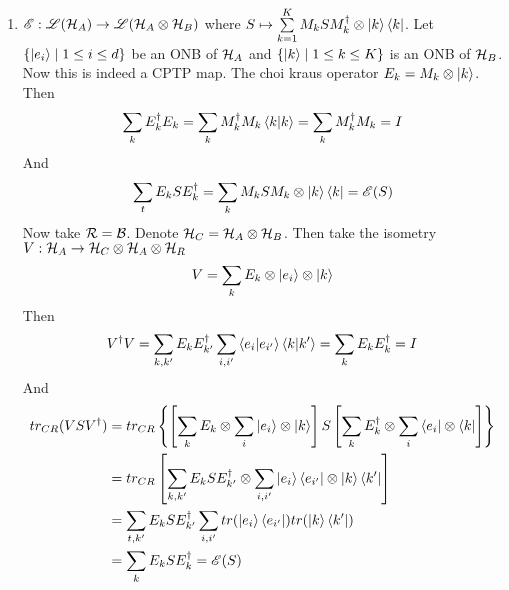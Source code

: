 \documentclass[a4paper, 11pt]{article}
\begin{document}
{\begin{enumerate}[label=(\arabic*)]
	
	\item ${\mathscr{E}}:{\mathscr{L}}(\mathcal{H}_A)\to {\mathscr{L}}(\mathcal{H}_A\otimes \mathcal{H}_B)$ where $S\mapsto \sum\limits_{k=1}^KM_kSM_k^{\dagger}\otimes \ket{k}\bra{k}$. Let $\{\ket{e_i}\mid 1\leq i\leq d\}$ be an ONB of $\mathcal{H}_A$ and  $\{\ket{k}\mid 1\leq k\leq K\}$ is an ONB of $\mathcal{H}_B$. Now this is indeed a CPTP map. The choi kraus operator $E_k=M_k\otimes \ket{k}$. Then $$\sum_kE_k^{\dagger}E_k=\sum_k M_k^{\dagger}M_k \bra{k}\ket{k}=\sum_kM_k^{\dagger}M_k=I$$And $$\sum_tE_kSE_k^{\dagger}=\sum_kM_kSM_k\otimes \ket{k}\bra{k}={\mathscr{E}}(S)$$Now take $\mathcal{R}=\mathcal{B}$. Denote $\mathcal{H}_C=\mathcal{H}_A\otimes \mathcal{H}_B$. Then take the isometry $V:\mathcal{H}_A\to\mathcal{H}_C\otimes \mathcal{H}_A\otimes \mathcal{H}_R$ $$V=\sum_kE_k\otimes \ket{e_i}\otimes \ket{k}$$Then 
	$$V^{\dagger}V=\sum_{k,k'}E_kE_{k'}^{\dagger}\sum_{i,i'}\bra{e_i}\ket{e_{i'}}\bra{k}\ket{k'}=\sum_kE_kE^{\dagger}_k=I$$And \begin{align*}
	tr_{CR}(VSV^{\dagger}) & = tr_{CR}\left\{  \left[\sum_kE_k\otimes \sum_i\ket{e_i}\otimes \ket{k}\right]S\left[ \sum_kE_k^{\dagger}\otimes \sum_i\bra{e_i}\otimes \bra{k}\right]   \right\}\\
	& = 	 tr_{CR}\left[\sum_{k,k'}E_kSE_{k'}^{\dagger}\otimes \sum_{i,i'}\ket{e_i}\bra{e_{i'}}\otimes \ket{k}\bra{k'}\right]\\
	& = \sum_{t,k'} E_kSE_{k'}^{\dagger}\sum_{i,i'}tr(\ket{e_i}\bra{e_{i'}}) tr(\ket{k}\bra{k'})\\
	& = \sum_kE_kSE_k^{\dagger}={\mathscr{E}}(S)
\end{align*}
	
\end{enumerate}

}
\end{document}

